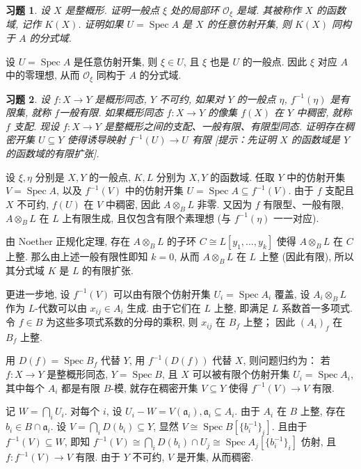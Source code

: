 \documentclass{article}
\theoremstyle{exercise}
\newtheorem{exercise}{习题}[section]
\newenvironment{proofc}{\proof}{\endproof}
\def\ga{\mathfrak{a}}
\def\cO{\mathcal{O}}
\def\Spec{\operatorname{Spec}}
\begin{document}
\begin{exercise}
  设 $X$ 是整概形. 证明一般点 $\xi$ 处的局部环 $\cO_{\xi}$ 是域.
  其被称作 $X$ 的\emph{函数域}, 记作 $K(X)$.
  证明如果 $U = \Spec A$ 是 $X$ 的任意仿射开集, 则 $K(X)$ 同构于 $A$ 的分式域.
\end{exercise}

\begin{proofc}
  设 $U = \Spec A$ 是任意仿射开集, 则 $\xi \in U$, 且 $\xi$ 也是 $U$ 的一般点.
  因此 $\xi$ 对应 $A$ 中的零理想, 从而 $\cO_{\xi}$ 同构于 $A$ 的分式域.
\end{proofc}

\begin{exercise}
  设 $f \colon X \to Y$ 是概形同态, $Y$ 不可约,
  如果对 $Y$ 的一般点 $\eta$, $f^{-1}(\eta)$ 是有限集, 就称 $f$\emph{一般有限}.
  如果概形同态 $f \colon X \to Y$ 的像集 $f(X)$ 在 $Y$ 中稠密, 就称 $f$ \emph{支配}.
  现设 $f \colon X \to Y$ 是整概形之间的支配、一般有限、有限型同态.
  证明存在稠密开集 $U \subseteq Y$ 使得诱导映射 $f^{-1}(U) \to U$ 有限
  [\emph{提示：先证明 $X$ 的函数域是 $Y$ 的函数域的有限扩张}].
\end{exercise}

\begin{proofc}
  设 $\xi, \eta$ 分别是 $X, Y$ 的一般点, $K, L$ 分别为 $X, Y$ 的函数域.
  任取 $Y$ 中的仿射开集 $V = \Spec A$,
  以及 $f^{-1}(V)$ 中的仿射开集 $U = \Spec A \subseteq f^{-1}(V)$.
  由于 $f$ 支配且 $X$ 不可约, $f(U)$ 在 $V$ 中稠密,
  因此 $A \otimes_B L$ 非零.
  又因为 $f$ 有限型、一般有限, $A \otimes_B L$ 在 $L$ 上有限生成,
  且仅包含有限个素理想 (与 $f^{-1}(\eta)$ 一一对应).

  由 Noether 正规化定理, 存在 $A \otimes_B L$ 的子环 $C \cong L[y_1, \dots, y_k]$ 使得
  $A \otimes_B L$ 在 $C$ 上整. 那么由上述一般有限性即知 $k = 0$,
  从而 $A \otimes_B L$ 在 $L$ 上整 (因此有限), 所以其分式域 $K$ 是 $L$ 的有限扩张.

  更进一步地, 设 $f^{-1}(V)$ 可以由有限个仿射开集 $U_i = \Spec A_i$ 覆盖,
  设 $A_i \otimes_B L$ 作为 $L$-代数可以由 $x_{ij} \in A_i$ 生成.
  由于它们在 $L$ 上整, 即满足 $L$ 系数首一多项式.
  令 $f \in B$ 为这些多项式系数的分母的乘积, 则 $x_{ij}$ 在 $B_f$ 上整；
  因此 $(A_i)_f$ 在 $B_f$ 上整.

  用 $D(f) = \Spec B_f$ 代替 $Y$, 用 $f^{-1}(D(f))$ 代替 $X$,
  则问题归约为：
  若 $f \colon X \to Y$ 是整概形同态, $Y = \Spec B$,
  且 $X$ 可以被有限个仿射开集 $U_i = \Spec A_i$, 其中每个 $A_i$ 都是有限 $B$-模,
  就存在稠密开集 $V \subseteq Y$ 使得 $f^{-1}(V) \to V$ 有限.

  记 $W = \bigcap_i U_i$. 对每个 $i$, 设 $U_i - W = V(\ga_i), \ga_i \subseteq A_i$.
  由于 $A_i$ 在 $B$ 上整, 存在 $b_i \in B \cap \ga_i$.
  设 $V = \bigcap_i D(b_i) \subseteq Y$, 显然 $V \cong \Spec B[\{ b_i^{-1} \}_i]$.
  且由于 $f^{-1}(V) \subseteq W$,
  即知 $f^{-1}(V) \cong \bigcap_i D(b_i) \cap U_j \cong \Spec A_j[\{ b_i^{-1} \}_i]$
  仿射, 且 $f \colon f^{-1}(V) \to V$ 有限.
  由于 $Y$ 不可约, $V$ 是开集, 从而稠密.
\end{proofc}
\end{document}
